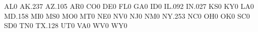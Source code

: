 AL0
AK.237
AZ.105
AR0
CO0
DE0
FL0
GA0
ID0
IL.092
IN.027
KS0
KY0
LA0
MD.158
MI0
MS0
MO0
MT0
NE0
NV0
NJ0
NM0
NY.253
NC0
OH0
OK0
SC0
SD0
TN0
TX.128
UT0
VA0
WV0
WY0
